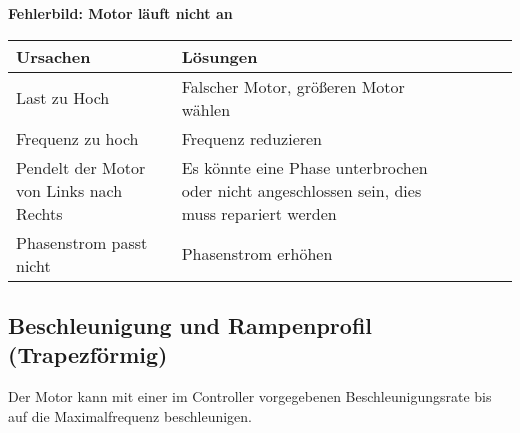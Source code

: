 {\textbf{Fehlerbild: Motor läuft nicht an} 
\begin{center}
	\fontsize{8}{10}\selectfont
	\begin{tabularx}{\textwidth}{|X|X|X|X|X|X|}
		\hline 
		\textbf{Ursachen} & \textbf{Lösungen} \\ \hline
		Last zu Hoch & Falscher Motor, größeren Motor wählen \\ \hline
		Frequenz zu hoch & Frequenz reduzieren\\ \hline
		Pendelt der Motor von Links nach Rechts & Es könnte eine Phase unterbrochen oder nicht angeschlossen sein, dies muss repariert werden \\ \hline
		Phasenstrom passt nicht & Phasenstrom erhöhen\\ \hline

	\end{tabularx}
		 \label{MOTLNA} 
\end{center}


\subsection{Beschleunigung und Rampenprofil (Trapezförmig)}

Der Motor kann mit einer im Controller vorgegebenen Beschleunigungsrate bis auf die Maximalfrequenz beschleunigen.\cite{FaulhaberDriveSystems.2020} 

}
